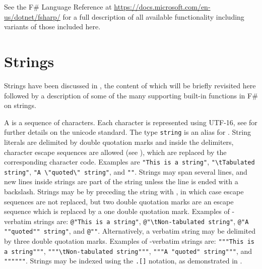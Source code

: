 \documentclass[fsharpnotes.tex]{subfiles}
\begin{document}
See the F\# Language Reference at \url{https://docs.microsoft.com/en-us/dotnet/fsharp/} for a full description of all available functionality including variants of those included here.

\section{Strings}
\label{sec:strings}
Strings have been discussed in , the content of which will be briefly revisited here followed by a description of some of the many supporting built-in functions in F\# on strings.

A  is a sequence of characters. Each character is represented using UTF-16, see  for further details on the unicode standard. The type \lstinline{string} is an alias for . String literals are delimited by double quotation marks  and inside the delimiters, character escape sequences are allowed (see ), which are replaced by the corresponding character code. Examples are \lstinline{"This is a string"}, \lstinline{"\tTabulated string"}, \lstinline{"A \"quoted\" string"}, and \lstinline{""}. Strings may span several lines, and new lines inside strings are part of the string unless the line is ended with a backslash. Strings may be  by preceding the string with , in which case escape sequences are not replaced, but two double quotation marks are an escape sequence which is replaced by a one double quotation mark. Examples of -verbatim strings are: \lstinline{@"This is a string"}, \lstinline{@"\tNon-tabulated string"}, \lstinline{@"A ""quoted"" string"}, and \lstinline{@""}. Alternatively, a verbatim string may be delimited by three double quotation marks. Examples of -verbatim strings are: \lstinline{"""This is a string"""}, \lstinline{"""\tNon-tabulated string"""}, \lstinline{"""A "quoted" string"""}, and \lstinline{""""""}. Strings may be indexed using the \lstinline{.[]} notation, as demonstrated in .
\end{document}
